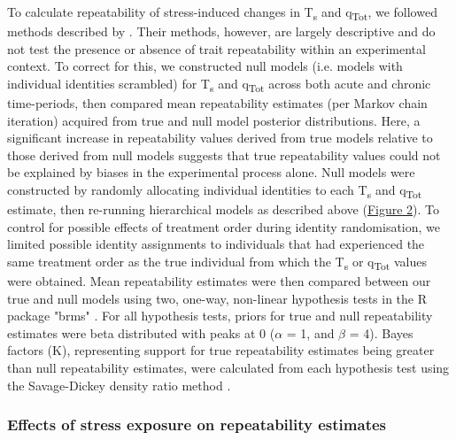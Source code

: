 \documentclass[12pt]{article}
\begin{document}
\noindent To calculate repeatability of stress-induced changes in T\textsubscript{s} and q\textsubscript{Tot}, we followed methods described by \citet{araya_2015}. Their methods, however, are largely descriptive and do not test the presence or absence of trait repeatability within an experimental context. To correct for this, we constructed null models (i.e. models with individual identities scrambled) for T\textsubscript{s} and q\textsubscript{Tot} across both acute and chronic time-periods, then compared mean repeatability estimates (per Markov chain iteration) acquired from true and null model posterior distributions. Here, a significant increase in repeatability values derived from true models relative to those derived from null models suggests that true repeatability values could not be explained by biases in the experimental process alone. Null models were constructed by randomly allocating individual identities to each T\textsubscript{s} and q\textsubscript{Tot} estimate, then re-running hierarchical models as described above (\hyperref[Fig4.2]{Figure 2}). To control for possible effects of treatment order during identity randomisation, we limited possible identity assignments to individuals that had experienced the same treatment order as the true individual from which the T\textsubscript{s} or q\textsubscript{Tot} values were obtained. Mean repeatability estimates were then compared between our true and null models using two, one-way, non-linear hypothesis tests in the R package "brms" \citep{burkner_2017}. For all hypothesis tests, priors for true and null repeatability estimates were beta distributed with peaks at 0 ($\alpha$ = 1, and $\beta$ = 4). Bayes factors (K), representing support for true repeatability estimates being greater than null repeatability estimates, were calculated from each hypothesis test using the Savage-Dickey density ratio method \citep{wagenmakers_2010}.\vspace{0.5cm}  

\subsubsection{Effects of stress exposure on repeatability estimates}
\vspace{0.5cm}
\end{document}
